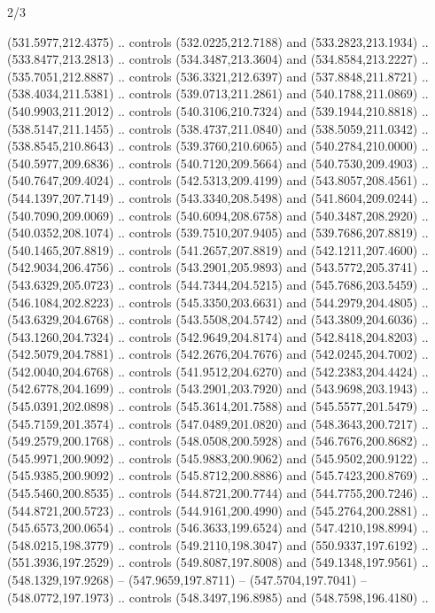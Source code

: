 \begin{flagdescription}{2/3}
\begin{scope}[xshift=0.5\flaglength,yshift=0.5\flagwidth,scale=\flagwidth/495.65]
\begin{scope}[y=0.8pt, x=0.8pt, yscale=-1,shift={(-463.76,-309.78)}]
  (531.5977,212.4375) .. controls (532.0225,212.7188) and (533.2823,213.1934) ..
  (533.8477,213.2813) .. controls (534.3487,213.3604) and (534.8584,213.2227) ..
  (535.7051,212.8887) .. controls (536.3321,212.6397) and (537.8848,211.8721) ..
  (538.4034,211.5381) .. controls (539.0713,211.2861) and (540.1788,211.0869) ..
  (540.9903,211.2012) .. controls (540.3106,210.7324) and (539.1944,210.8818) ..
  (538.5147,211.1455) .. controls (538.4737,211.0840) and (538.5059,211.0342) ..
  (538.8545,210.8643) .. controls (539.3760,210.6065) and (540.2784,210.0000) ..
  (540.5977,209.6836) .. controls (540.7120,209.5664) and (540.7530,209.4903) ..
  (540.7647,209.4024) .. controls (542.5313,209.4199) and (543.8057,208.4561) ..
  (544.1397,207.7149) .. controls (543.3340,208.5498) and (541.8604,209.0244) ..
  (540.7090,209.0069) .. controls (540.6094,208.6758) and (540.3487,208.2920) ..
  (540.0352,208.1074) .. controls (539.7510,207.9405) and (539.7686,207.8819) ..
  (540.1465,207.8819) .. controls (541.2657,207.8819) and (542.1211,207.4600) ..
  (542.9034,206.4756) .. controls (543.2901,205.9893) and (543.5772,205.3741) ..
  (543.6329,205.0723) .. controls (544.7344,204.5215) and (545.7686,203.5459) ..
  (546.1084,202.8223) .. controls (545.3350,203.6631) and (544.2979,204.4805) ..
  (543.6329,204.6768) .. controls (543.5508,204.5742) and (543.3809,204.6036) ..
  (543.1260,204.7324) .. controls (542.9649,204.8174) and (542.8418,204.8203) ..
  (542.5079,204.7881) .. controls (542.2676,204.7676) and (542.0245,204.7002) ..
  (542.0040,204.6768) .. controls (541.9512,204.6270) and (542.2383,204.4424) ..
  (542.6778,204.1699) .. controls (543.2901,203.7920) and (543.9698,203.1943) ..
  (545.0391,202.0898) .. controls (545.3614,201.7588) and (545.5577,201.5479) ..
  (545.7159,201.3574) .. controls (547.0489,201.0820) and (548.3643,200.7217) ..
  (549.2579,200.1768) .. controls (548.0508,200.5928) and (546.7676,200.8682) ..
  (545.9971,200.9092) .. controls (545.9883,200.9062) and (545.9502,200.9122) ..
  (545.9385,200.9092) .. controls (545.8712,200.8886) and (545.7423,200.8769) ..
  (545.5460,200.8535) .. controls (544.8721,200.7744) and (544.7755,200.7246) ..
  (544.8721,200.5723) .. controls (544.9161,200.4990) and (545.2764,200.2881) ..
  (545.6573,200.0654) .. controls (546.3633,199.6524) and (547.4210,198.8994) ..
  (548.0215,198.3779) .. controls (549.2110,198.3047) and (550.9337,197.6192) ..
  (551.3936,197.2529) .. controls (549.8087,197.8008) and (549.1348,197.9561) ..
  (548.1329,197.9268) -- (547.9659,197.8711) -- (547.5704,197.7041) --
  (548.0772,197.1973) .. controls (548.3497,196.8985) and (548.7598,196.4180) ..

\end{scope}
\end{scope}
\end{flagdescription}
